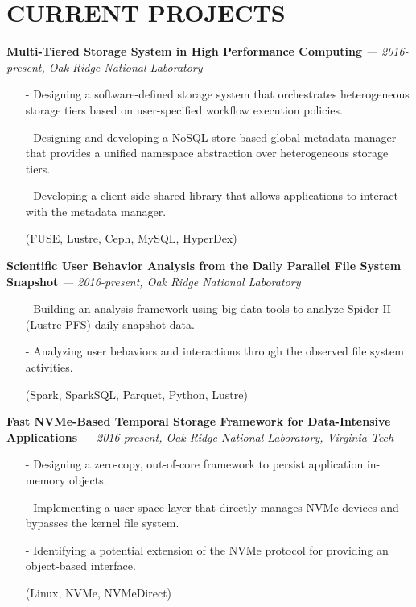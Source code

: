 \section{CURRENT PROJECTS}
\vspace{.03in}
  {\bf Multi-Tiered Storage System in High Performance Computing}
   {\it \footnotesize --- 2016-present, Oak Ridge National Laboratory}
   \begin{itemize}[leftmargin=*]
    \setlength\itemsep{-0.02in}
    \item[-] Designing a software-defined storage system that orchestrates
	     heterogeneous storage tiers based on user-specified workflow execution
             policies.
    \item[-] Designing and developing a NoSQL store-based global metadata manager
	     that provides a unified namespace abstraction over heterogeneous
	     storage tiers.
    \item[-] Developing a client-side shared library that allows applications to interact
             with the metadata manager.
    \item[] {\small(FUSE, Lustre, Ceph, MySQL, HyperDex)}
   \end{itemize}
  \vspace{-0.15in}
  {\bf Scientific User Behavior Analysis from the Daily Parallel File System Snapshot}
   {\it \footnotesize --- 2016-present, Oak Ridge National Laboratory}
   \begin{itemize}[leftmargin=*]
    \setlength\itemsep{-0.02in}
    \item[-] Building an analysis framework using big data tools to analyze Spider II (Lustre PFS) daily snapshot data.
    \item[-] Analyzing user behaviors and interactions through the observed file system activities.
    \item[] {\small(Spark, SparkSQL, Parquet, Python, Lustre)}
   \end{itemize}
  \vspace{-0.15in}
  {\bf Fast NVMe-Based Temporal Storage Framework for Data-Intensive Applications}
   {\it \footnotesize --- 2016-present, Oak Ridge National Laboratory, Virginia Tech}
   \begin{itemize}[leftmargin=*]
    \setlength\itemsep{-0.02in}
    \item[-] Designing a zero-copy, out-of-core framework to persist application in-memory objects.
    \item[-] Implementing a user-space layer that directly manages NVMe
             devices and bypasses the kernel file system.
    \item[-] Identifying a potential extension of the NVMe protocol for providing an object-based interface.
    \item[] {\small(Linux, NVMe, NVMeDirect)}
   \end{itemize}
 
